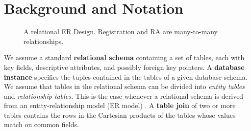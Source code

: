 \documentclass{sig-alternate-2013}
\begin{document}
\section{Background and Notation}


\begin{figure}[htbp] %
 \centering
{} 
\caption{A relational ER Design. Registration and RA are many-to-many relationships.}
 \label{fig:university-schema}
\end{figure}
 We assume a standard \textbf{relational schema} containing a set of tables, each with key fields, %
descriptive attributes, and possibly foreign key pointers. 
A \textbf{database instance} specifies the tuples contained in the tables of a given database schema. 
We assume that tables in the relational schema can be divided into {\em entity tables} and {\em relationship tables.} 
This is the case whenever a relational schema is derived from an entity-relationship model (ER model) \cite[Ch.2.2]{Ullman1982}. A \textbf{table join} of two or more tables contains the rows in the Cartesian products of the tables whose values match on common fields.
\end{document}
